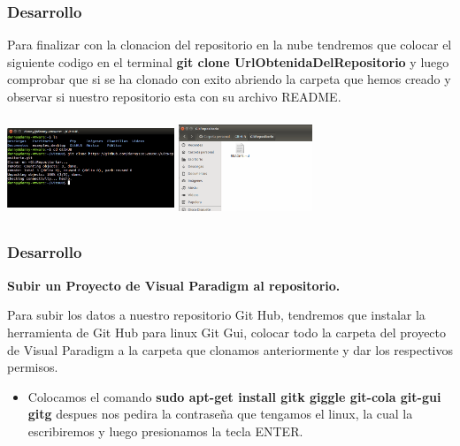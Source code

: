 \documentclass[8pt]{beamer}
\begin{document}
\begin{frame}
\frametitle{Desarrollo}
\setlength{\parskip}{00pt}
Para finalizar con la clonacion del repositorio en la nube tendremos que colocar el siguiente codigo en el terminal \textbf{git clone UrlObtenidaDelRepositorio} y luego comprobar que si se ha clonado con exito abriendo la carpeta que hemos creado y observar si nuestro repositorio esta con su archivo README. 
\begin{center}

\setlength{\parskip}{08pt}
\includegraphics[width=5cm, height=3cm]{img/nueve} \hspace{0.5cm}
\includegraphics[width=4cm, height=3cm]{img/diez}
\end{center}
\end{frame}


\begin{frame}
\frametitle{Desarrollo}

\textbf{Subir un Proyecto de Visual Paradigm al repositorio.}

Para subir los datos a nuestro repositorio Git Hub, tendremos que instalar la herramienta de Git Hub para linux Git Gui, colocar todo la carpeta del proyecto de Visual Paradigm a la carpeta que clonamos anteriormente y dar los respectivos permisos. 

\setlength{\parskip}{03pt}
\begin{center}
\begin{itemize}
\justifying
\item{Colocamos el comando \textbf{sudo apt-get install gitk giggle git-cola git-gui gitg} despues nos pedira la contraseña que tengamos el linux, la cual la escribiremos y luego presionamos la tecla ENTER.}
\end{itemize} 

\setlength{\parskip}{01pt}
\end{center}
\end{frame}
\end{document}
